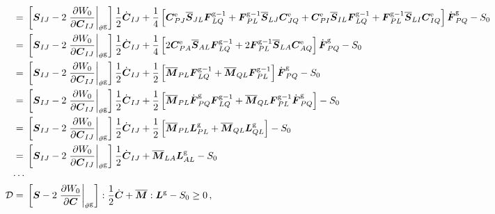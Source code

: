 \documentclass[10pt,letterpaper,oneside]{report}
\newcommand{\ten}[1]{\mbox{\boldmath $#1$}{}}
\newcommand{\scas}[1]{\mbox{{\scriptsize{${\rm{#1}}$}}}{}}
\begin{document}
\begin{itemize}
\begin{align}
\notag \\
={}& \left[ \ten{S}_{IJ} - 2 \left. \frac{\partial W_0 }{\partial \ten{C}_{IJ}} \right|_{\vartheta^{\scas{g}}} \right] \frac{1}{2} \dot{\ten{C}}_{IJ} 
+ \frac{1}{4} \left[ 
\ten{C}^{\scas{e}}_{PJ} \overline{\ten{S}}_{JL} \ten{F}^{\scas{g}-1}_{LQ}   
+ \ten{F}^{\scas{g}-1}_{PL} \overline{\ten{S}}_{LJ} \ten{C}^{\scas{e}}_{JQ} 
+ \ten{C}^{\scas{e}}_{PI} \overline{\ten{S}}_{IL} \ten{F}^{\scas{g}-1}_{LQ} 
+ \ten{F}^{\scas{g}-1}_{PL} \overline{\ten{S}}_{LI} \ten{C}^{\scas{e}}_{IQ} 
\right] \dot{\ten{F}}^{\scas{g}}_{PQ} - S_0  
\notag \\
={}& \left[ \ten{S}_{IJ} - 2 \left. \frac{\partial W_0 }{\partial \ten{C}_{IJ}} \right|_{\vartheta^{\scas{g}}} \right] \frac{1}{2} \dot{\ten{C}}_{IJ} 
+ \frac{1}{4} \left[ 2 \ten{C}^{\scas{e}}_{PA} \overline{\ten{S}}_{AL} \ten{F}^{\scas{g}-1}_{LQ} + 2 \ten{F}^{\scas{g}-1}_{PL} \overline{\ten{S}}_{LA} \ten{C}^{\scas{e}}_{AQ} \right] \dot{\ten{F}}^{\scas{g}}_{PQ} - S_0  
\notag \\
={}& \left[ \ten{S}_{IJ} - 2 \left. \frac{\partial W_0 }{\partial \ten{C}_{IJ}} \right|_{\vartheta^{\scas{g}}} \right] \frac{1}{2} \dot{\ten{C}}_{IJ} 
+ \frac{1}{2} \left[ \overline{\ten{M}}_{PL} \ten{F}^{\scas{g}-1}_{LQ} + \overline{\ten{M}}_{QL} \ten{F}^{\scas{g}-1}_{PL} \right] \dot{\ten{F}}^{\scas{g}}_{PQ} - S_0  
\notag \\
={}& \left[ \ten{S}_{IJ} - 2 \left. \frac{\partial W_0 }{\partial \ten{C}_{IJ}} \right|_{\vartheta^{\scas{g}}} \right] \frac{1}{2} \dot{\ten{C}}_{IJ} 
+ \frac{1}{2} \left[ \overline{\ten{M}}_{PL} \dot{\ten{F}}^{\scas{g}}_{PQ} \ten{F}^{\scas{g}-1}_{LQ} + \overline{\ten{M}}_{QL} \ten{F}^{\scas{g}-1}_{PL} \dot{\ten{F}}^{\scas{g}}_{PQ} \right] - S_0  
\notag \\
={}& \left[ \ten{S}_{IJ} - 2 \left. \frac{\partial W_0 }{\partial \ten{C}_{IJ}} \right|_{\vartheta^{\scas{g}}} \right] \frac{1}{2} \dot{\ten{C}}_{IJ} 
+ \frac{1}{2} \left[ \overline{\ten{M}}_{PL} \ten{L}^{\scas{g}}_{PL} + \overline{\ten{M}}_{QL} \ten{L}^{\scas{g}}_{QL} \right] - S_0  
\notag \\
={}& \left[ \ten{S}_{IJ} - 2 \left. \frac{\partial W_0 }{\partial \ten{C}_{IJ}} \right|_{\vartheta^{\scas{g}}} \right] \frac{1}{2} \dot{\ten{C}}_{IJ} + \overline{\ten{M}}_{LA} \ten{L}^{\scas{g}}_{AL} - S_0 
\notag \\
\cdots{}& \notag \\
\mathcal{D} ={}& \left[ \ten{S} - 2 \left. \frac{\partial W_0}{\partial \ten{C}} \right|_{\vartheta^{\scas{g}}} \right] : \frac{1}{2} \dot{\ten{C}} + \overline{\ten{M}} : \ten{L}^{\scas{g}} - S_0 \geq 0 \, , 

\end{align}
\end{itemize}
\end{document}
